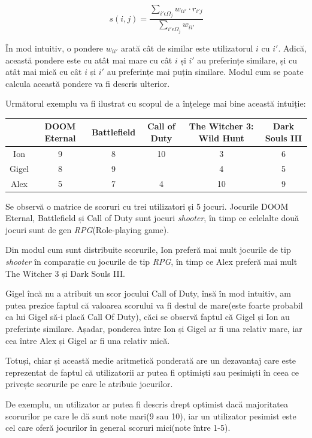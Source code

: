 \documentclass[12pt,a4paper]{report}
\begin{document}
\[ s(i, j) = \dfrac{ \sum\limits_{i' \epsilon \Omega_{j} } w_{ii'} \cdot r_{i'j} }{\sum\limits_{i' \epsilon \Omega_{j}} w_{ii'}}  \]

În mod intuitiv, o pondere \( w_{ii'}\) arată cât de similar este utilizatorul \( i \) cu \(i'\). Adică, această pondere este cu atât mai mare cu cât \( i \) și \( i' \) au preferințe similare, și cu atât mai mică cu cât \( i \) și \( i' \) au preferințe mai puțin similare. Modul cum se poate calcula această pondere va fi descris ulterior.

Următorul exemplu va fi ilustrat cu scopul de a înțelege mai bine această intuiție:

\begin{center}
\begin{tabular}{||c c c c c c||} 
 \hline
 & DOOM Eternal & Battlefield & Call of Duty & The Witcher 3: Wild Hunt & Dark Souls III \\ [0.5ex] 
 \hline\hline
 Ion & 9 & 8 & 10 & 3 & 6 \\ 
 \hline
 Gigel & 8 & 9 & & 4 & 5  \\
 \hline
 Alex & 5 & 7 & 4 & 10 & 9 \\
 \hline
\end{tabular}
\end{center}

Se observă o matrice de scoruri cu trei utilizatori și 5 jocuri. Jocurile DOOM Eternal, Battlefield și Call of Duty sunt jocuri \emph{shooter}, în timp ce celelalte două jocuri sunt de gen \emph{RPG}(Role-playing game).

Din modul cum sunt distribuite scorurile, Ion preferă mai mult jocurile de tip \emph{shooter} în comparație cu jocurile de tip \emph{RPG}, în timp ce Alex preferă mai mult The Witcher 3 și Dark Souls III.

Gigel încă nu a atribuit un scor jocului Call of Duty, însă în mod intuitiv, am putea prezice faptul că valoarea scorului va fi destul de mare(este foarte probabil ca lui Gigel să-i placă Call Of Duty), căci se observă faptul că Gigel și Ion au preferințe similare. Așadar, ponderea între Ion și Gigel ar fi una relativ mare, iar cea între Alex și Gigel ar fi una relativ mică.

\newpage

Totuși, chiar și această medie aritmetică ponderată are un dezavantaj care este reprezentat de faptul că utilizatorii ar putea fi optimiști sau pesimiști în ceea ce privește scorurile pe care le atribuie jocurilor. 

De exemplu, un utilizator ar putea fi descris drept optimist dacă majoritatea scorurilor pe care le dă sunt note mari(9 sau 10), iar un utilizator pesimist este cel care oferă jocurilor în general scoruri mici(note între 1-5).
\end{document}

